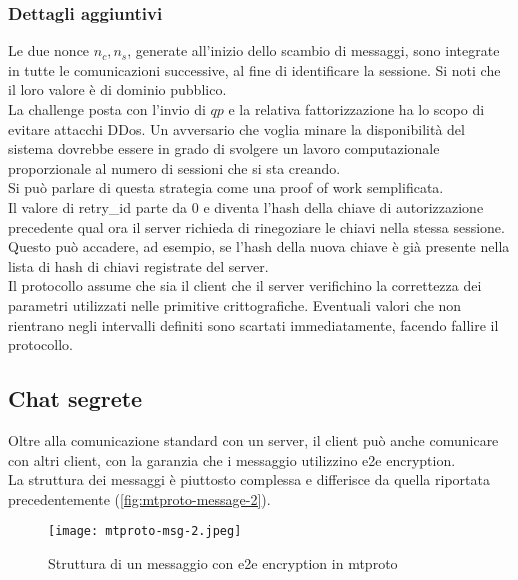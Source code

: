 

\subsubsection{Dettagli aggiuntivi}
Le due nonce $n_c, n_s$, generate all'inizio dello scambio di messaggi, sono integrate in tutte le comunicazioni successive,
al fine di identificare la sessione.
Si noti che il loro valore è di dominio pubblico. \\

La challenge posta con l'invio di $qp$ e la relativa fattorizzazione ha lo scopo di evitare attacchi DDos.
Un avversario che voglia minare la disponibilità del sistema dovrebbe essere in grado di svolgere un lavoro computazionale
proporzionale al numero di sessioni che si sta creando. \\
Si può parlare di questa strategia come una proof of work semplificata. \\

Il valore di retry\_id parte da 0 e diventa l'hash della chiave di autorizzazione precedente qual ora il server
richieda di rinegoziare le chiavi nella stessa sessione.
Questo può accadere, ad esempio, se l'hash della nuova chiave è già presente nella lista di hash di chiavi registrate del server. \\

Il protocollo assume che sia il client che il server verifichino la correttezza dei parametri utilizzati nelle primitive crittografiche.
Eventuali valori che non rientrano negli intervalli definiti sono scartati immediatamente, facendo fallire il protocollo.

\subsection{Chat segrete}
Oltre alla comunicazione standard con un server, il client può anche comunicare con altri client, con la garanzia che i messaggio utilizzino \gls{e2e} encryption. \\
La struttura dei messaggi è piuttosto complessa e differisce da quella riportata precedentemente (\autoref{fig:mtproto-message-2}). \\

\begin{figure}[h]
    \texttt{[image: mtproto-msg-2.jpeg]}
    \caption{Struttura di un messaggio con \gls{e2e} encryption in \gls{mtproto} \cite{man:mtproto}} \label{fig:mtproto-message-2}
\end{figure}

